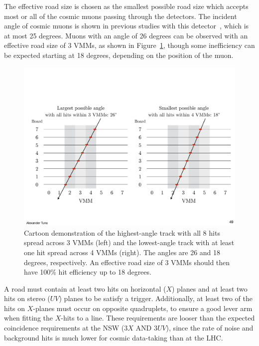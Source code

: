 The effective road size is chosen as the smallest possible road size which accepts most or all of the cosmic muons passing through the detectors. The incident angle of cosmic muons is shown in previous studies with this detector~\cite{noisy,noiseless}, which is at most 25 degrees. Muons with an angle of 26 degrees can be observed with an effective road size of 3 VMMs, as shown in Figure~\ref{fig:cartoon_road_efficiency}, though some inefficiency can be expected starting at 18 degrees, depending on the position of the muon.

\begin{figure}[!htpb]
  \begin{center}
    \includegraphics[width=1.0\textwidth]{figures/cartoons/cartoon_road_efficiency}
  \end{center}
  \vspace{-20pt}
  \caption{Cartoon demonstration of the highest-angle track with all 8 hits spread across 3 VMMs (left) and the lowest-angle track with at least one hit spread across 4 VMMs (right). The angles are 26 and 18 degrees, respectively. An effective road size of 3 VMMs should then have 100\% hit efficiency up to 18 degrees.}
  \label{fig:cartoon_road_efficiency}
\end{figure}

A road must contain at least two hits on horizontal ($X$) planes and at least two hits on stereo ($UV$) planes to be satisfy a trigger. Additionally, at least two of the hits on $X$-planes must occur on opposite quadruplets, to ensure a good lever arm when fitting the $X$-hits to a line. These requirements are looser than the expected coincidence requirements at the NSW ($3X$ AND $3UV$), since the rate of noise and background hits is much lower for cosmic data-taking than at the LHC.


